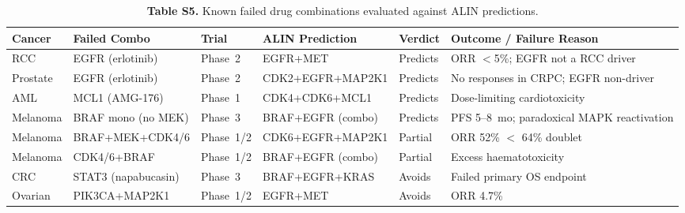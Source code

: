 \documentclass[11pt]{article}
\begin{document}
\begin{table}[htbp]
\centering
\caption{\textbf{Table S5.} Known failed drug combinations evaluated against ALIN predictions.}
\label{tab:s5_failed_combos_supp}
\scriptsize
\setlength{\tabcolsep}{3pt}
\begin{tabular}{@{}p{1.8cm}p{2.2cm}p{1.5cm}p{2.4cm}lp{3.8cm}@{}}
\toprule
\textbf{Cancer} & \textbf{Failed Combo} & \textbf{Trial} & \textbf{ALIN Prediction} & \textbf{Verdict} & \textbf{Outcome / Failure Reason} \\
\midrule
RCC & EGFR (erlotinib) & Phase~2 & EGFR+MET & Predicts & ORR $<$5\%; EGFR not a RCC driver \\
Prostate & EGFR (erlotinib) & Phase~2 & CDK2+EGFR+MAP2K1 & Predicts & No responses in CRPC; EGFR non-driver \\
AML & MCL1 (AMG-176) & Phase~1 & CDK4+CDK6+MCL1 & Predicts & Dose-limiting cardiotoxicity \\
Melanoma & BRAF mono (no MEK) & Phase~3 & BRAF+EGFR (combo) & Predicts & PFS 5--8~mo; paradoxical MAPK reactivation \\
\midrule
Melanoma & BRAF+MEK+CDK4/6 & Phase~1/2 & CDK6+EGFR+MAP2K1 & Partial & ORR 52\% $<$ 64\% doublet \\
Melanoma & CDK4/6+BRAF & Phase~1/2 & BRAF+EGFR (combo) & Partial & Excess haematotoxicity \\
\midrule
CRC & STAT3 (napabucasin) & Phase~3 & BRAF+EGFR+KRAS & Avoids & Failed primary OS endpoint \\
Ovarian & PIK3CA+MAP2K1 & Phase~1/2 & EGFR+MET & Avoids & ORR 4.7\% \\
\bottomrule
\end{tabular}
\normalsize
\end{table}
\end{document}

